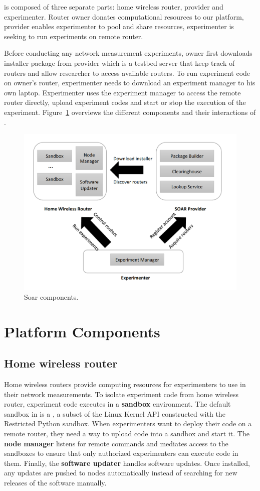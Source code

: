 \sysname is composed of three separate parts: home wireless router, \sysname provider and experimenter. Router owner donates computational resources to our platform, \sysname provider enables experimenter to pool and share resources, experimenter is seeking to run experiments on remote router.

Before conducting any network measurement experiments, owner first downloads installer package from \sysname provider which is a testbed server that keep track of routers and allow researcher to access available routers. To run experiment code on owner's router, experimenter needs to download an experiment manager to his own laptop. Experimenter uses the experiment manager to access the remote router directly, upload experiment codes and start or stop the execution of the experiment. Figure~\ref{fig-arch} overviews the different components and their interactions of \sysname.

\begin{figure}%
\centering
\includegraphics[width=0.8\columnwidth]{figure/soar-arch.png}
\caption{Soar components.}
\label{fig-arch}
\end{figure}

\section{Platform Components}
\subsection{Home wireless router}
Home wireless routers provide computing resources for experimenters to use in their network measurements. To isolate experiment code from home wireless router, experiment code executes in a \textbf{sandbox} environment. The default sandbox in \sysname is a \sandboxname, a subset of the Linux Kernel API constructed with the Restricted Python sandbox. When experimenters want to deploy their code on a remote router, they need a way to upload code into a sandbox and start it. The \textbf{node manager} listens for remote commands and mediates access to the sandboxes to ensure that only authorized experimenters can execute code in them. Finally, the \textbf{software updater} handles software updates. Once installed, any updates are pushed to nodes automatically instead of searching for new releases of the software manually.  
